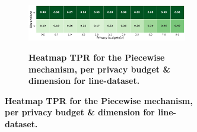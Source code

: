 \begin{figure}[H]
\begin{subfigure}[b]{0.9\textwidth}
        \begin{subfigure}[c]{1\textwidth}
            \caption{\textbf{Heatmap TPR for the Piecewise mechanism, per privacy budget \& dimension for line-dataset.}}
            \includegraphics[width=1\textwidth]{Results/kd-laplace/piecewise/line-dataset/tpr.png}
            \label{fig:privacy_tpr_line-dataset_adversial_advantage_piecewise}
        \end{subfigure}
    \end{subfigure}
    \hfill %
    \begin{subfigure}[b]{0.075\textwidth}

\end{subfigure}
\end{figure}
